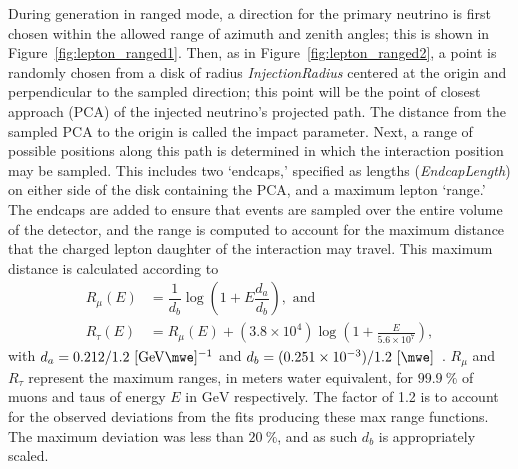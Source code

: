 \documentclass[main.tex]{subfiles}
\begin{document}
During generation in ranged mode, a direction for the primary neutrino is first chosen within the allowed range of azimuth and zenith angles; this is shown in Figure~\ref{fig:lepton_ranged1}.
Then, as in Figure~\ref{fig:lepton_ranged2}, a point is randomly chosen from a disk of radius \textit{InjectionRadius} centered at the origin and perpendicular to the sampled direction; this point will be the point of closest approach (PCA) of the injected neutrino's projected path.
The distance from the sampled PCA to the origin is called the impact parameter.
Next, a range of possible positions along this path is determined in which the interaction position may be sampled.
This includes two `endcaps,' specified as lengths (\textit{EndcapLength}) on either side of the disk containing the PCA, and a maximum lepton `range.'
The endcaps are added to ensure that events are sampled over the entire volume of the detector, and the range is computed to account for the maximum distance that the charged lepton daughter of the interaction may travel.
This maximum distance is calculated according to 
\begin{align}
R_{\mu}(E) &= \dfrac{1}{d_{b}}\log\left(1 + E\dfrac{d_{a}}{d_{b}}\right), \text{ and} \label{eq:dima1} \\
R_{\tau}(E) &= R_{\mu}(E) + \left(3.8\times 10^{4}\right)\log\left(1+\tfrac{E}{5.6\times 10^{7}}\right) \label{eq:dima2},
\end{align}
with $d_{a}=0.212/1.2~[\si{\GeV\mwe}]^{-1}$ and $d_{b}=(0.251\times 10^{-3})/1.2~[\si{\per\mwe}]$~\cite{chirkin2004propagating}.
$R_{\mu}$ and $R_{\tau}$ represent the maximum ranges, in meters water equivalent, for $\SI{99.9}\percent$ of muons and taus of energy $E$ in $\si\GeV$ respectively. 
The factor of 1.2 is to account for the observed deviations from the fits producing these max range functions. 
The maximum deviation was less than $\SI{20}\percent$, and as such $d_{b}$ is appropriately scaled.
\end{document}
